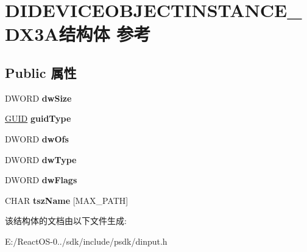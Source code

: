 \hypertarget{struct_d_i_d_e_v_i_c_e_o_b_j_e_c_t_i_n_s_t_a_n_c_e___d_x3_a}{}\section{D\+I\+D\+E\+V\+I\+C\+E\+O\+B\+J\+E\+C\+T\+I\+N\+S\+T\+A\+N\+C\+E\+\_\+\+D\+X3\+A结构体 参考}
\label{struct_d_i_d_e_v_i_c_e_o_b_j_e_c_t_i_n_s_t_a_n_c_e___d_x3_a}
\subsection*{Public 属性}
\begin{DoxyCompactItemize}
\item 
\mbox{\label{struct_d_i_d_e_v_i_c_e_o_b_j_e_c_t_i_n_s_t_a_n_c_e___d_x3_a_ad2be79921c2a6afc2b0a4e751dcc4d19}} 
D\+W\+O\+RD {\bfseries dw\+Size}
\item 
\mbox{\label{struct_d_i_d_e_v_i_c_e_o_b_j_e_c_t_i_n_s_t_a_n_c_e___d_x3_a_a44018cda7a4d2b15e39ca97ff2e19fca}} 
\hyperlink{interface_g_u_i_d}{G\+U\+ID} {\bfseries guid\+Type}
\item 
\mbox{\label{struct_d_i_d_e_v_i_c_e_o_b_j_e_c_t_i_n_s_t_a_n_c_e___d_x3_a_adaad5ae2233a23c80d7898522b4b03c5}} 
D\+W\+O\+RD {\bfseries dw\+Ofs}
\item 
\mbox{\label{struct_d_i_d_e_v_i_c_e_o_b_j_e_c_t_i_n_s_t_a_n_c_e___d_x3_a_a05c5bf2410970e7d6a01b9c66cb86570}} 
D\+W\+O\+RD {\bfseries dw\+Type}
\item 
\mbox{\label{struct_d_i_d_e_v_i_c_e_o_b_j_e_c_t_i_n_s_t_a_n_c_e___d_x3_a_a2940957f14171d5807ab871b05e44d39}} 
D\+W\+O\+RD {\bfseries dw\+Flags}
\item 
\mbox{\label{struct_d_i_d_e_v_i_c_e_o_b_j_e_c_t_i_n_s_t_a_n_c_e___d_x3_a_a8b6305835cf6467621227215d15d16c3}} 
C\+H\+AR {\bfseries tsz\+Name} \mbox{[}M\+A\+X\+\_\+\+P\+A\+TH\mbox{]}
\end{DoxyCompactItemize}


该结构体的文档由以下文件生成\+:\begin{DoxyCompactItemize}
\item 
E\+:/\+React\+O\+S-\/0../sdk/include/psdk/dinput.\+h\end{DoxyCompactItemize}
